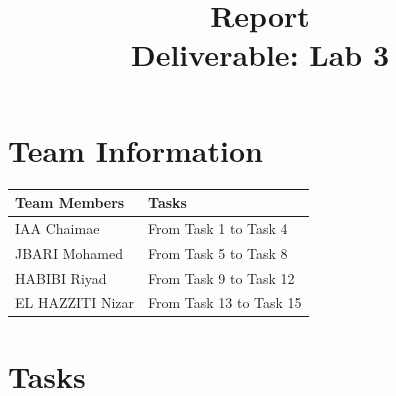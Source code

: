 \documentclass[11pt,a4paper]{article}
\title{\textbf{Report\\Deliverable: Lab 3}}
\author{}
\date{}
\begin{document}
\maketitle

\section*{Team Information}

\begin{table}[h!]
\centering
\begin{tabular}{ll}
\toprule
\textbf{Team Members} & \textbf{Tasks} \\
\midrule
IAA Chaimae & From Task 1 to Task 4 \\
JBARI Mohamed & From Task 5 to Task 8 \\
HABIBI Riyad & From Task 9 to Task 12 \\
EL HAZZITI Nizar & From Task 13 to Task 15 \\
\bottomrule
\end{tabular}
\end{table}

\section*{Tasks}
\end{document}
